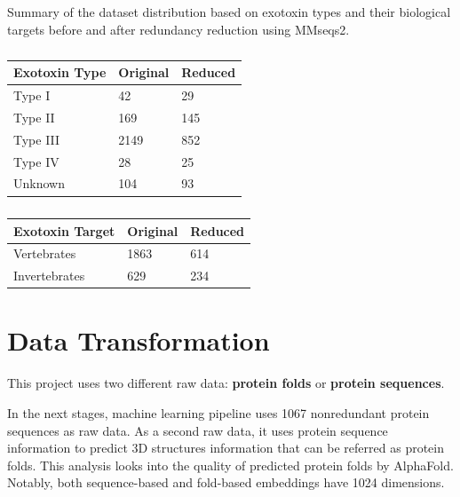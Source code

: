 \begin{table}[H]
	\centering
	\caption{Summary of the dataset distribution based on exotoxin types and their biological targets before and after redundancy reduction using MMseqs2.}
	
	\label{tab:merged_dataset_distribution}
	
	\begin{subtable}[t]{0.45\textwidth}
		\centering
		\caption{}
		\label{tab:exotoxin_types_merged}
		\begin{tabular}{@{}lll@{}}
			\toprule
			\textbf{Exotoxin Type} & \textbf{Original} & \textbf{Reduced} \\ \midrule
			Type I & 42 & 29 \\
			Type II & 169 & 145 \\
			Type III & 2149 & 852 \\
			Type IV & 28 & 25 \\
			Unknown & 104 & 93 \\
			\bottomrule
		\end{tabular}
	\end{subtable}
	\hfill
	\begin{subtable}[t]{0.45\textwidth}
		\centering
		\caption{}
		\label{tab:exotoxin_targets_merged}
		\begin{tabular}{@{}lll@{}}
			\toprule
			\textbf{Exotoxin Target} & \textbf{Original} & \textbf{Reduced} \\ \midrule
			Vertebrates & 1863 & 614 \\
			Invertebrates & 629 & 234 \\
			\bottomrule
		\end{tabular}
	\end{subtable}
\end{table}



\section{Data Transformation}

This project uses two different raw data: \textbf{protein folds} or \textbf{protein sequences}. 

In the next stages, machine learning pipeline uses 1067 nonredundant protein sequences as raw data. As a second raw data, it uses protein sequence information to predict 3D structures information that can be referred as protein folds. This analysis looks into the quality of predicted protein folds by AlphaFold. Notably, both sequence-based and fold-based embeddings have 1024 dimensions.

